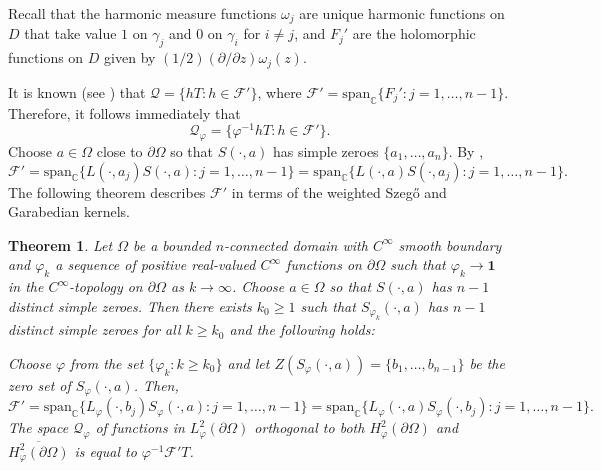 \documentclass[11pt, reqno]{amsart}
\newtheorem{thm}{Theorem}[section]
\numberwithin{equation}{section}
\begin{document}
\medskip

Recall that the harmonic measure functions $\omega_j$ are unique harmonic functions on $D$ that take value $1$ on $\gamma_j$ and $0$ on $\gamma_i$ for $i\neq j$, and $F_j'$ are the holomorphic functions on $D$ given by $(1/2)(\partial/\partial z)\omega_j(z)$.

\medskip

It is known (see \cite{Be0}) that $\mathcal{Q}=\{hT : h\in \mathcal{F}'\}$, where $\mathcal{F}'=\text{span}_{\mathbb{C}}\{F_j' : j=1,\ldots, n-1\}$. Therefore, it follows immediately that
\[
\mathcal{Q}_{\varphi} = \{\varphi^{-1}hT: h\in\mathcal{F}'\}.
\]
Choose $a\in\Omega$ close to $\partial\Omega$ so that $S(\cdot,a)$ has simple zeroes $\{a_1,\ldots,a_n\}$. By \cite{Be0},
\begin{equation}
\mathcal{F}'=\text{span}_{\mathbb{C}}\{L(\cdot,a_j)S(\cdot,a) : j=1,\ldots,n-1\} = \text{span}_{\mathbb{C}}\{L(\cdot,a)S(\cdot,a_j) : j=1,\ldots,n-1\}. 
\end{equation}
The following theorem describes $\mathcal{F}'$ in terms of the weighted Szeg\H{o} and Garabedian kernels.

\begin{thm}
Let $\Omega$ be a bounded $n$-connected domain with $C^{\infty}$ smooth boundary and $\varphi_k$ a sequence of positive real-valued $C^{\infty}$ functions on $\partial\Omega$ such that $\varphi_k\rightarrow \mathbf{1}$ in the $C^{\infty}$-topology on $\partial\Omega$ as $k\rightarrow\infty$. Choose $a\in\Omega$ so that $S(\cdot,a)$ has $n-1$ distinct simple zeroes. Then there exists $k_0\ge 1$ such that $S_{\varphi_k}(\cdot,a)$ has $n-1$ distinct simple zeroes for all $k\geq k_0$ and the following holds:

\medskip

Choose $\varphi$ from the set $\{\varphi_k :k\geq k_0\}$ and let  $Z(S_{\varphi}(\cdot,a))=\{b_1,\ldots,b_{n-1}\}$ be the zero set of $S_{\varphi}(\cdot, a)$. Then, 
\begin{equation}
\mathcal{F}'
=
\text{span}_{\mathbb{C}}\{L_{\varphi}(\cdot,b_j)S_{\varphi}(\cdot,a) : j=1,\ldots,n-1\}
=
\text{span}_{\mathbb{C}}\{L_{\varphi}(\cdot,a)S_{\varphi}(\cdot,b_j) : j=1,\ldots,n-1\}. 
\end{equation}
The space $\mathcal{Q}_{\varphi}$ of functions in $L^2_{\varphi}(\partial\Omega)$ orthogonal to both $H^2_{\varphi}(\partial\Omega)$ and $\overline{H^2_{\varphi}(\partial\Omega)}$ is equal to $\varphi^{-1}\mathcal{F}'T$.
\end{thm}
\end{document}
